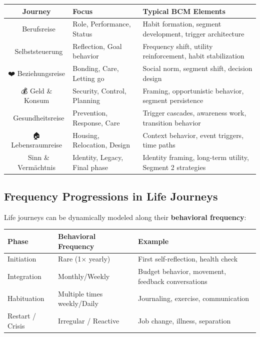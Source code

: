 {{{\begin{center}
\small
\begin{tabular}{@{}clp{5.5cm}@{}}
\toprule
\textbf{Journey} & \textbf{Focus} & \textbf{Typical BCM Elements} \\
\midrule
💼 Berufsreise & Role, Performance, Status & Habit formation, segment development, trigger architecture \\
🧠 Selbststeuerung & Reflection, Goal behavior & Frequency shift, utility reinforcement, habit stabilization \\
❤️ Beziehungsreise & Bonding, Care, Letting go & Social norm, segment shift, decision design \\
💰 Geld \& Konsum & Security, Control, Planning & Framing, opportunistic behavior, segment persistence \\
🏥 Gesundheitsreise & Prevention, Response, Care & Trigger cascades, awareness work, transition behavior \\
🏠 Lebensraumreise & Housing, Relocation, Design & Context behavior, event triggers, time paths \\
🧭 Sinn \& Vermächtnis & Identity, Legacy, Final phase & Identity framing, long-term utility, Segment 2 strategies \\
\bottomrule
\end{tabular}
\end{center}

\subsection{Frequency Progressions in Life Journeys}

Life journeys can be dynamically modeled along their \textbf{behavioral frequency}:

\begin{center}
\small
\begin{tabular}{@{}lll@{}}
\toprule
\textbf{Phase} & \textbf{Behavioral Frequency} & \textbf{Example} \\
\midrule
Initiation & Rare (1× yearly) & First self-reflection, health check \\
Integration & Monthly/Weekly & Budget behavior, movement, feedback conversations \\
Habituation & Multiple times weekly/Daily & Journaling, exercise, communication \\
Restart / Crisis & Irregular / Reactive & Job change, illness, separation \\
\bottomrule
\end{tabular}
\end{center}

}}}
